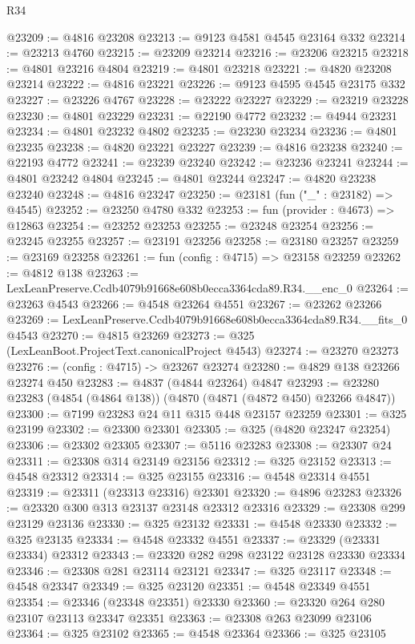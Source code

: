 \begin{lexlean}{R34}
\begin{coremodule}
@23209 := @4816 @23208
@23213 := @9123 @4581 @4545 @23164 @332
@23214 := @23213 @4760
@23215 := @23209 @23214
@23216 := @23206 @23215
@23218 := @4801 @23216 @4804
@23219 := @4801 @23218
@23221 := @4820 @23208 @23214
@23222 := @4816 @23221
@23226 := @9123 @4595 @4545 @23175 @332
@23227 := @23226 @4767
@23228 := @23222 @23227
@23229 := @23219 @23228
@23230 := @4801 @23229
@23231 := @22190 @4772
@23232 := @4944 @23231
@23234 := @4801 @23232 @4802
@23235 := @23230 @23234
@23236 := @4801 @23235
@23238 := @4820 @23221 @23227
@23239 := @4816 @23238
@23240 := @22193 @4772
@23241 := @23239 @23240
@23242 := @23236 @23241
@23244 := @4801 @23242 @4804
@23245 := @4801 @23244
@23247 := @4820 @23238 @23240
@23248 := @4816 @23247
@23250 := @23181 (fun ("_" : @23182) => @4545)
@23252 := @23250 @4780 @332
@23253 := fun (provider : @4673) => @12863
@23254 := @23252 @23253
@23255 := @23248 @23254
@23256 := @23245 @23255
@23257 := @23191 @23256
@23258 := @23180 @23257
@23259 := @23169 @23258
@23261 := fun (config : @4715) => @23158 @23259
@23262 := @4812 @138
@23263 := LexLeanPreserve.Ccdb4079b91668e608b0ecca3364cda89.R34.__enc_0
@23264 := @23263 @4543
@23266 := @4548 @23264 @4551
@23267 := @23262 @23266
@23269 := LexLeanPreserve.Ccdb4079b91668e608b0ecca3364cda89.R34.__fits_0 @4543
@23270 := @4815 @23269
@23273 := @325 (LexLeanBoot.ProjectText.canonicalProject @4543)
@23274 := @23270 @23273
@23276 := (config : @4715) -> @23267 @23274
@23280 := @4829 @138 @23266 @23274 @450
@23283 := @4837 (@4844 @23264) @4847
@23293 := @23280 @23283 (@4854 (@4864 @138)) (@4870 (@4871 (@4872 @450) @23266 @4847))
@23300 := @7199 @23283 @24 @11 @315 @448 @23157 @23259
@23301 := @325 @23199
@23302 := @23300 @23301
@23305 := @325 (@4820 @23247 @23254)
@23306 := @23302 @23305
@23307 := @5116 @23283
@23308 := @23307 @24
@23311 := @23308 @314 @23149 @23156
@23312 := @325 @23152
@23313 := @4548 @23312
@23314 := @325 @23155
@23316 := @4548 @23314 @4551
@23319 := @23311 (@23313 @23316) @23301
@23320 := @4896 @23283
@23326 := @23320 @300 @313 @23137 @23148 @23312 @23316
@23329 := @23308 @299 @23129 @23136
@23330 := @325 @23132
@23331 := @4548 @23330
@23332 := @325 @23135
@23334 := @4548 @23332 @4551
@23337 := @23329 (@23331 @23334) @23312
@23343 := @23320 @282 @298 @23122 @23128 @23330 @23334
@23346 := @23308 @281 @23114 @23121
@23347 := @325 @23117
@23348 := @4548 @23347
@23349 := @325 @23120
@23351 := @4548 @23349 @4551
@23354 := @23346 (@23348 @23351) @23330
@23360 := @23320 @264 @280 @23107 @23113 @23347 @23351
@23363 := @23308 @263 @23099 @23106
@23364 := @325 @23102
@23365 := @4548 @23364
@23366 := @325 @23105

\end{coremodule}
\end{lexlean}
